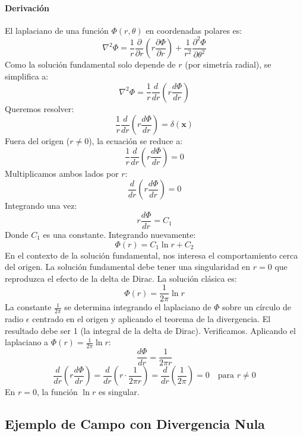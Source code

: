 \documentclass[11pt]{book}
\theoremstyle{definicion}
\theoremstyle{teorema}
\theoremstyle{ejemplo}
\begin{document}
\paragraph{Derivación}

El laplaciano de una función \( \Phi(r, \theta) \) en coordenadas polares es:
\[
\nabla^2 \Phi = \frac{1}{r} \frac{\partial}{\partial r}\left(r \frac{\partial \Phi}{\partial r}\right) + \frac{1}{r^2} \frac{\partial^2 \Phi}{\partial \theta^2}
\]
Como la solución fundamental solo depende de \( r \) (por simetría radial), se simplifica a:
\[
\nabla^2 \Phi = \frac{1}{r} \frac{d}{dr}\left(r \frac{d\Phi}{dr}\right)
\]
Queremos resolver:
\[
\frac{1}{r} \frac{d}{dr}\left(r \frac{d\Phi}{dr}\right) = \delta(\mathbf{x})
\]
Fuera del origen (\( r \neq 0 \)), la ecuación se reduce a:
\[
\frac{1}{r} \frac{d}{dr}\left(r \frac{d\Phi}{dr}\right) = 0
\]
%
Multiplicamos ambos lados por \( r \):
\[
\frac{d}{dr}\left(r \frac{d\Phi}{dr}\right) = 0
\]
Integrando una vez:
\[
r \frac{d\Phi}{dr} = C_1
\]
Donde \( C_1 \) es una constante. Integrando nuevamente:
\[
\Phi(r) = C_1 \ln r + C_2
\]
%
En el contexto de la solución fundamental, nos interesa el comportamiento cerca del origen.
La solución fundamental debe tener una singularidad en \( r = 0 \) que reproduzca el efecto de la delta de Dirac. La solución clásica es:
\[
\Phi(r) = \frac{1}{2\pi} \ln r
\]
La constante \( \frac{1}{2\pi} \) se determina integrando el laplaciano de \( \Phi \) sobre un círculo de radio \( \epsilon \) centrado en el origen y aplicando el teorema de la divergencia. El resultado debe ser 1 (la integral de la delta de Dirac).
Verificamos.
Aplicando el laplaciano a \( \Phi(r) = \frac{1}{2\pi} \ln r \):
\[
\frac{d\Phi}{dr} = \frac{1}{2\pi r}
\]
\[
\frac{d}{dr}\left(r \frac{d\Phi}{dr}\right) = \frac{d}{dr}\left(r \cdot \frac{1}{2\pi r}\right) = \frac{d}{dr}\left(\frac{1}{2\pi}\right) = 0 \quad \text{para } r \neq 0
\]
En \( r = 0 \), la función \( \ln r \) es singular. %

\subsection{Ejemplo de Campo con Divergencia Nula}
\end{document}
